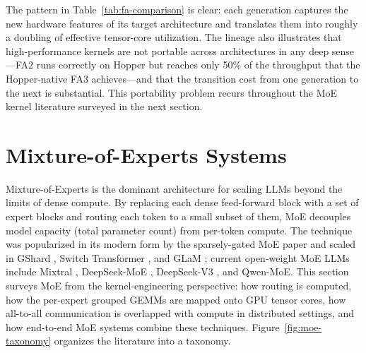 \documentclass[10pt]{article}
\begin{document}
The pattern in Table~\ref{tab:fa-comparison} is clear: each generation captures the new hardware features of its target architecture and translates them into roughly a doubling of effective tensor-core utilization. The lineage also illustrates that high-performance kernels are not portable across architectures in any deep sense---FA2 runs correctly on Hopper but reaches only 50\% of the throughput that the Hopper-native FA3 achieves---and that the transition cost from one generation to the next is substantial. This portability problem recurs throughout the MoE kernel literature surveyed in the next section.

\section{Mixture-of-Experts Systems}
\label{sec:moe}

Mixture-of-Experts is the dominant architecture for scaling LLMs beyond the limits of dense compute. By replacing each dense feed-forward block with a set of expert blocks and routing each token to a small subset of them, MoE decouples model capacity (total parameter count) from per-token compute. The technique was popularized in its modern form by the sparsely-gated MoE paper \citep{shazeer2017outrageously} and scaled in GShard \citep{lepikhin2021gshard}, Switch Transformer \citep{fedus2022switch}, and GLaM \citep{du2022glam}; current open-weight MoE LLMs include Mixtral \citep{jiang2024mixtral}, DeepSeek-MoE \citep{dai2024deepseekmoe}, DeepSeek-V3 \citep{liu2024deepseekv3}, and Qwen-MoE. This section surveys MoE from the kernel-engineering perspective: how routing is computed, how the per-expert grouped GEMMs are mapped onto GPU tensor cores, how all-to-all communication is overlapped with compute in distributed settings, and how end-to-end MoE systems combine these techniques. Figure~\ref{fig:moe-taxonomy} organizes the literature into a taxonomy.
\end{document}
